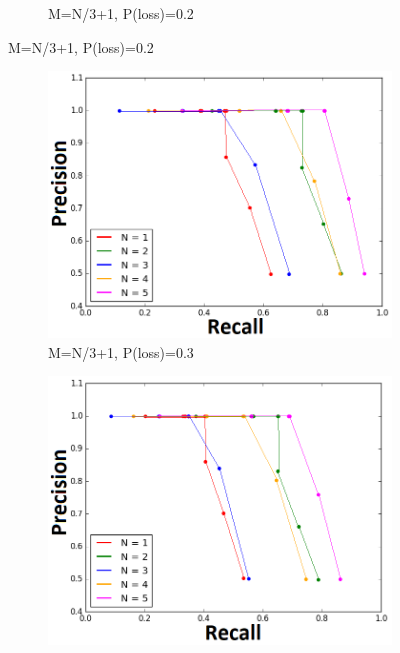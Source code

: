 \documentclass[10pt,conference,compsocconf]{IEEEtran}
\begin{document}
\begin{enumerate}
\begin{figure}
\begin{subfigure}{\textwidth}
  \caption{M=N/3+1, P(loss)=0.2}
	\label{fig:packetlosses02}
\end{subfigure}
\end{figure}
\begin{figure}%
\label{fig:packetlosses2}
\begin{subfigure}{\textwidth}
  \centering
  \includegraphics[width=\linewidth]{img/THIRD_03_loss.png}
  \caption{M=N/3+1, P(loss)=0.3}
	\label{fig:packetlosses03}
\end{subfigure}%
\begin{subfigure}{\textwidth}
  \centering
  \includegraphics[width=\linewidth]{img/THIRD_04_loss.png}

\end{subfigure}
\end{figure}
\end{enumerate}
\end{document}
